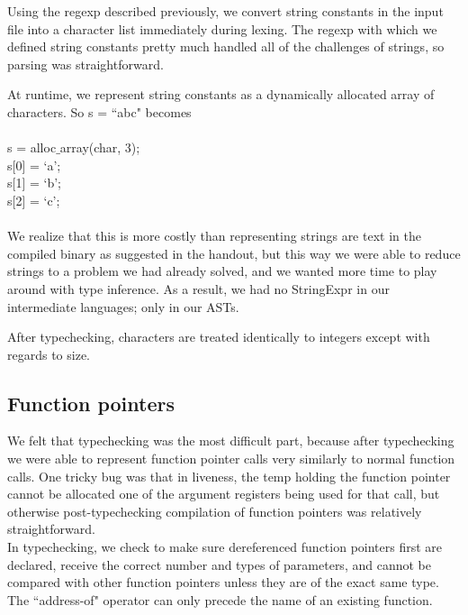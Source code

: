 \documentclass{article}
\begin{document}
Using the regexp described previously, we convert string constants in the input file into a character list immediately during lexing. The regexp with which we defined string constants pretty much handled all of the challenges of strings, so parsing was straightforward.

At runtime, we represent string constants as a dynamically allocated array of characters. So s = ``abc" becomes\\
\\
s = alloc$\_$array(char, 3);\\
s[0] = `a';\\
s[1] = `b';\\
s[2] = `c';\\
\\
We realize that this is more costly than representing strings are text in the compiled binary as suggested in the handout, but this way we were able to reduce strings to a problem we had already solved, and we wanted more time to play around with type inference. As a result, we had no StringExpr in our intermediate languages; only in our ASTs.

After typechecking, characters are treated identically to integers except with regards to size.

\subsection{Function pointers}
We felt that typechecking was the most difficult part, because after typechecking we were able to represent function pointer calls very similarly to normal function calls. One tricky bug was that in liveness, the temp holding the function pointer cannot be allocated one of the argument registers being used for that call, but otherwise post-typechecking compilation of function pointers was relatively straightforward.\\ 

In typechecking, we check to make sure dereferenced function pointers first are declared, receive the correct number and types of parameters, and cannot be compared with other function pointers unless they are of the exact same type. The ``address-of" operator can only precede the name of an existing function.
\end{document}
